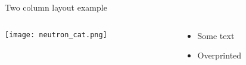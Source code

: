 \documentclass[talk.tex]{subfiles}
\begin{document}
    \begin{frame}{Two column layout example}
	\begin{columns}
	    \begin{column}[T]{0.7\textwidth}
		\texttt{[image: neutron\_cat.png]}
	    \end{column}
	    \begin{column}[T]{0.3\textwidth}
		\begin{overprint}
		    \begin{itemize}
			\item Some text
		    \end{itemize}
		    \begin{itemize}
			\item Overprinted
		    \end{itemize}
		\end{overprint}
	    \end{column}
	\end{columns}
    \end{frame}
\end{document}
